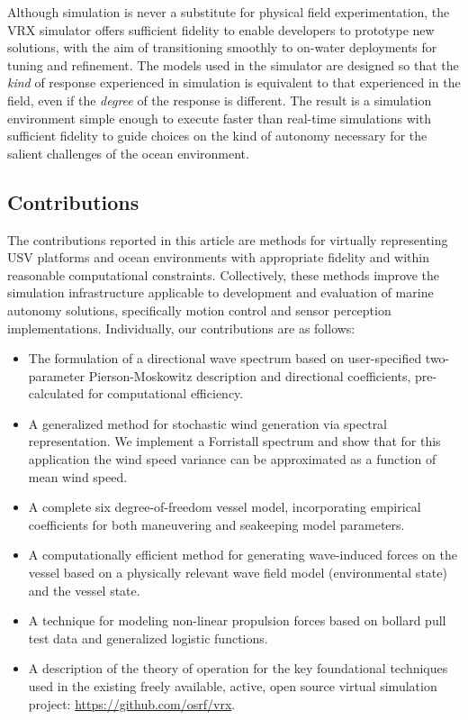 \documentclass[utf8]{frontiersSCNS} %
\begin{document}
Although simulation is never a substitute for physical field experimentation, the VRX simulator offers sufficient fidelity to enable developers to prototype new solutions, with the aim of transitioning smoothly to on-water deployments for tuning and refinement. The models used in the simulator are designed so that the \emph{kind} of response experienced in simulation is equivalent to that experienced in the field, even if the \emph{degree} of the response is different. The result is a simulation environment simple enough to execute faster than real-time simulations with sufficient fidelity to guide choices on the kind of autonomy necessary for the salient challenges of the ocean environment.


\subsection{Contributions}
The contributions reported in this article are methods for virtually representing USV platforms and ocean environments with appropriate fidelity and within reasonable computational constraints. Collectively, these methods improve the simulation infrastructure applicable to development and evaluation of marine autonomy solutions, specifically motion control and sensor perception implementations. Individually, our contributions are as follows: 
\begin{itemize}
\item The formulation of a directional wave spectrum based on user-specified two-parameter Pierson-Moskowitz description and directional coefficients, pre-calculated for computational efficiency.
\item A generalized method for stochastic wind generation via spectral representation. We implement a Forristall spectrum and show that for this application the wind speed variance can be approximated as a function of mean wind speed.
\item A complete six degree-of-freedom vessel model, incorporating empirical coefficients for both maneuvering and seakeeping model parameters.
\item A computationally efficient method for generating wave-induced forces on the vessel based on a physically relevant wave field model (environmental state) and the vessel state.
 \item A technique for modeling non-linear propulsion forces based on bollard pull test data and generalized logistic functions.
\item A description of the theory of operation for the key foundational techniques used in the existing freely available, active, open source virtual simulation project: \url{https://github.com/osrf/vrx}.
\end{itemize}
\end{document}
